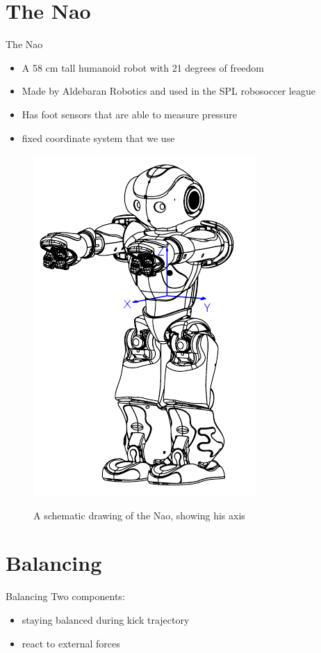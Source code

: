 \documentclass{beamer}
\begin{document}
\section{The Nao}
\begin{frame}{The Nao}
    \begin{itemize}
        \item A 58 cm tall humanoid robot with 21 degrees of freedom
        \item Made by Aldebaran Robotics and used in the SPL robosoccer league
        \item Has foot sensors that are able to measure pressure
        \item fixed coordinate system that we use
    \end{itemize}

    \begin{figure}[htb]
        \centering
        \includegraphics[scale=0.3]{pics/hardware_inertialunit.png}
        \label{fig:hardware}
        \caption{A schematic drawing of the Nao, showing his axis}
    \end{figure}
    
\end{frame}

\section{Balancing}
\begin{frame}{Balancing}
  Two components:
  \begin{itemize}
    \item staying balanced during kick trajectory
    \item react to external forces
  \end{itemize}
\end{frame}
\end{document}
